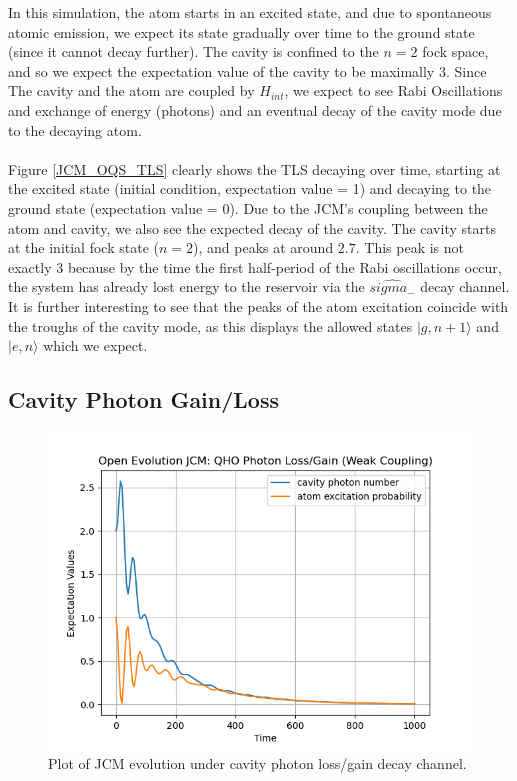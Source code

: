 \documentclass[12pt]{article}
\begin{document}
In this simulation, the atom starts in an excited state, and due to spontaneous atomic emission, we expect its state gradually over time to the ground state (since it cannot decay further). The cavity is confined to the $n=2$ fock space, and so we expect the expectation value of the cavity to be maximally $3$. Since The cavity and the atom are coupled by $H_{int}$, we expect to see Rabi Oscillations and exchange of energy (photons) and an eventual decay of the cavity mode due to the decaying atom. \\
\\
Figure \ref{JCM_OQS_TLS} clearly shows the TLS decaying over time, starting at the excited state (initial condition, expectation value = 1) and decaying to the ground state (expectation value = 0). Due to the JCM's coupling between the atom and cavity, we also see the expected decay of the cavity. The cavity starts at the initial fock state ($n=2$), and peaks at around $2.7$. This peak is not exactly $3$ because by the time the first half-period of the Rabi oscillations occur, the system has already lost energy to the reservoir via the $\hat{sigma_-}$ decay channel. It is further interesting to see that the peaks of the atom excitation coincide with the troughs of the cavity mode, as this displays the allowed states $|g,n+1\rangle$ and $|e,n\rangle$ which we expect. 

\subsection{Cavity Photon Gain/Loss}

\begin{figure}[h]
    \centering
    \includegraphics[width=\linewidth]{Research Project/Code/results/JCM/OQS_QHO_loss.png}
    \caption{Plot of JCM evolution under cavity photon loss/gain decay channel.}
    \label{JCM_OQS_QHO}
\end{figure}
\end{document}
